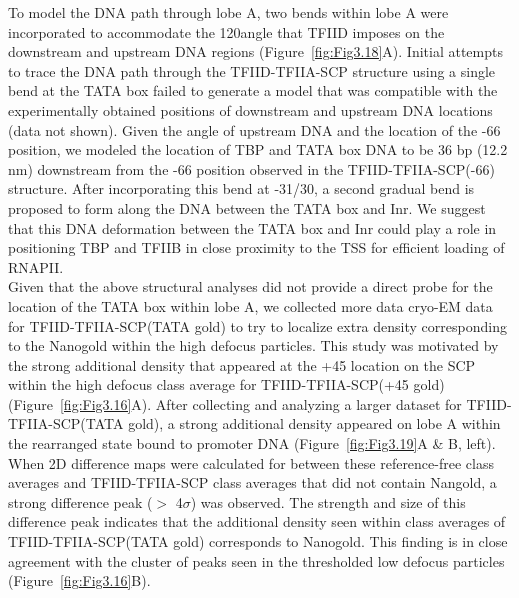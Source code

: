 \indent To model the DNA path through lobe A, two bends within lobe A were incorporated to accommodate the 120\textdegree angle that TFIID imposes on the downstream and upstream DNA regions (Figure~\ref{fig:Fig3.18}A). Initial attempts to trace the DNA path through the TFIID-TFIIA-SCP structure using a single bend at the TATA box failed to generate a model that was compatible with the experimentally obtained positions of downstream and upstream DNA locations (data not shown). Given the angle of upstream DNA and the location of the -66 position, we modeled the location of TBP and TATA box DNA to be 36 bp (12.2 nm) downstream from the -66 position observed in the TFIID-TFIIA-SCP(-66) structure. After incorporating this bend at -31/30, a second gradual bend is proposed to form along the DNA between the TATA box and Inr. We suggest that this DNA deformation between the TATA box and Inr could play a role in positioning TBP and TFIIB in close proximity to the TSS for efficient loading of RNAPII. \\
\indent Given that the above structural analyses did not provide a direct probe for the location of the TATA box within lobe A, we collected more data cryo-EM data for TFIID-TFIIA-SCP(TATA gold) to try to localize extra density corresponding to the Nanogold within the high defocus particles. This study was motivated by the strong additional density that appeared at the +45 location on the SCP within the high defocus class average for TFIID-TFIIA-SCP(+45 gold) (Figure~\ref{fig:Fig3.16}A). After collecting and analyzing a larger dataset for TFIID-TFIIA-SCP(TATA gold), a strong additional density appeared on lobe A within the rearranged state bound to promoter DNA (Figure~\ref{fig:Fig3.19}A \& B, left). When 2D difference maps were calculated for between these reference-free class averages and TFIID-TFIIA-SCP class averages that did not contain Nangold, a strong difference peak ($>$ 4$\sigma$) was observed. The strength and size of this difference peak indicates that the additional density seen within class averages of TFIID-TFIIA-SCP(TATA gold) corresponds to Nanogold. This finding is in close agreement with the cluster of peaks seen in the thresholded low defocus particles (Figure~\ref{fig:Fig3.16}B).\\ 
